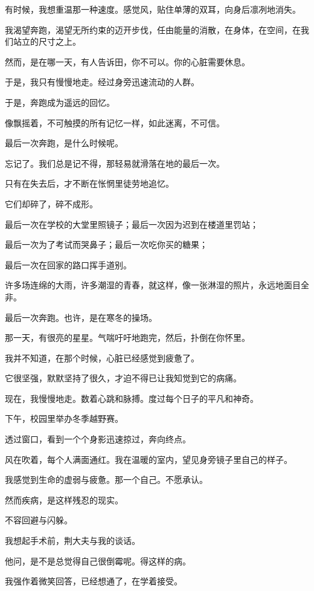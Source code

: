 \documentclass[12pt,a4paper]{article}
\def\blankrev{\vspace{1ex}}									%
\begin{document}
		\blankrev
		有时候，我想重温那一种速度。感觉风，贴住单薄的双耳，向身后凛冽地消失。\par
		我渴望奔跑，渴望无所约束的迈开步伐，任由能量的消散，在身体，在空间，在我们站立的尺寸之上。\par
		然而，是在哪一天，有人告诉田，你不可以。你的心脏需要休息。\par
		于是，我只有慢慢地走。经过身旁迅速流动的人群。\par
		于是，奔跑成为遥远的回忆。\par
		像飘摇着，不可触摸的所有记忆一样，如此迷离，不可信。\par
		最后一次奔跑，是什么时候呢。\par
		忘记了。我们总是记不得，那轻易就滑落在地的最后一次。\par
		只有在失去后，才不断在怅惘里徒劳地追忆。\par
		它们却碎了，碎不成形。\par
		最后一次在学校的大堂里照镜子；最后一次因为迟到在楼道里罚站；\par
		最后一次为了考试而哭鼻子；最后一次吃你买的糖果；\par
		最后一次在回家的路口挥手道别。\par
		许多场连绵的大雨，许多潮湿的青春，就这样，像一张淋湿的照片，永远地面目全非。\par
		最后一次奔跑。也许，是在寒冬的操场。\par
		那一天，有很亮的星星。气喘吁吁地跑完，然后，扑倒在你怀里。\par
		我并不知道，在那个时候，心脏已经感觉到疲惫了。\par
		它很坚强，默默坚持了很久，才迫不得已让我知觉到它的病痛。\par
		现在，我慢慢地走。数着心跳和脉搏。度过每个日子的平凡和神奇。\par
		下午，校园里举办冬季越野赛。\par
		透过窗口，看到一个个身影迅速掠过，奔向终点。\par
		风在吹着，每个人满面通红。我在温暖的室内，望见身旁镜子里自己的样子。\par
		我感觉到生命的虚弱与疲惫。那一个自己。不愿承认。\par
		然而疾病，是这样残忍的现实。\par
		不容回避与闪躲。\par
		我想起手术前，荆大夫与我的谈话。\par
		他问，是不是总觉得自己很倒霉呢。得这样的病。\par
		我强作着微笑回答，已经想通了，在学着接受。\par
\end{document}
